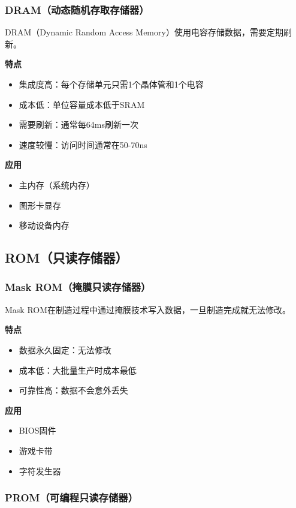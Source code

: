 \documentclass{article}
\begin{document}
\subsubsection{DRAM（动态随机存取存储器）}

DRAM（Dynamic Random Access Memory）使用电容存储数据，需要定期刷新。

\textbf{特点}
\begin{itemize}
    \item 集成度高：每个存储单元只需1个晶体管和1个电容
    \item 成本低：单位容量成本低于SRAM
    \item 需要刷新：通常每64ms刷新一次
    \item 速度较慢：访问时间通常在50-70ns
\end{itemize}

\textbf{应用}
\begin{itemize}
    \item 主内存（系统内存）
    \item 图形卡显存
    \item 移动设备内存
\end{itemize}

\subsection{ROM（只读存储器）}

\subsubsection{Mask ROM（掩膜只读存储器）}

Mask ROM在制造过程中通过掩膜技术写入数据，一旦制造完成就无法修改。

\textbf{特点}
\begin{itemize}
    \item 数据永久固定：无法修改
    \item 成本低：大批量生产时成本最低
    \item 可靠性高：数据不会意外丢失
\end{itemize}

\textbf{应用}
\begin{itemize}
    \item BIOS固件
    \item 游戏卡带
    \item 字符发生器
\end{itemize}

\subsubsection{PROM（可编程只读存储器）}
\end{document}
